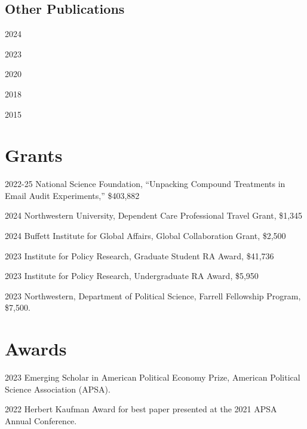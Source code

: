 \documentclass[12pt,letterpaper]{report}
\begin{document}
    \subsection*{Other Publications}
    \begin{tablist}
    \item[2024] \tab{} 
    \item[2023] \tab{}
    \item[2020] \tab{}
    \item[2018] \tab{}
    \item[2015] \tab{}
    \end{tablist}
	
    \section*{Grants}
	\begin{tablist}
	\item[2022-25]	\tab{}National Science Foundation, ``Unpacking Compound Treatments in Email Audit Experiments,'' \$403,882
		\item[2024] \tab{}Northwestern University, Dependent Care Professional Travel Grant, \$1,345
	\item[2024] \tab{}Buffett Institute for Global Affairs, Global Collaboration Grant, \$2,500
	\item[2023] \tab{}Institute for Policy Research, Graduate Student RA Award, \$41,736 
	\item[2023]	\tab{}Institute for Policy Research, Undergraduate RA Award, \$5,950
	\item[2023]	\tab{}Northwestern, Department of Political Science, Farrell Fellowship Program, \$7,500.
	\end{tablist}
	
	
    \section*{Awards}
	
	\begin{tablist}
	\item[2023] \tab{}Emerging Scholar in American Political Economy Prize, American Political Science Association (APSA).
	\item[2022] \tab{}Herbert Kaufman Award for best paper presented at the 2021 APSA Annual Conference.
	\end{tablist}
    
\end{document}
